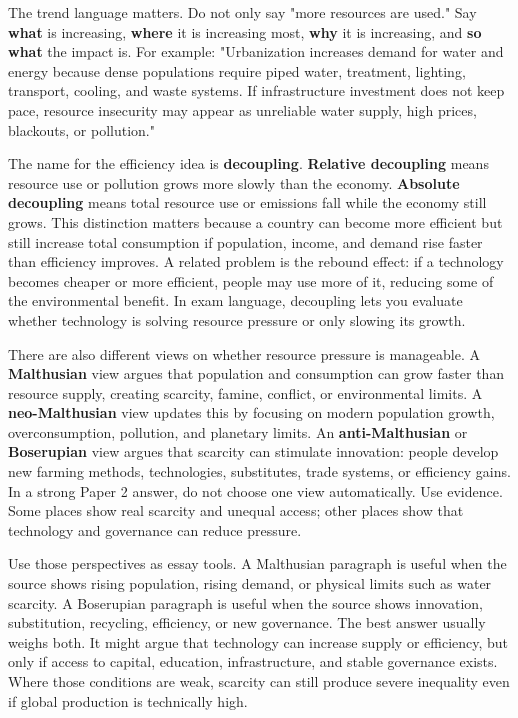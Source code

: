 \documentclass[11pt,a4paper]{article}
\newcommand{\term}[1]{\textcolor{HeadingBlue}{\textbf{#1}}}
\begin{document}
The trend language matters. Do not only say "more resources are used." Say
\term{what} is increasing, \term{where} it is increasing most, \term{why} it is
increasing, and \term{so what} the impact is. For example: "Urbanization
increases demand for water and energy because dense populations require piped
water, treatment, lighting, transport, cooling, and waste systems. If
infrastructure investment does not keep pace, resource insecurity may appear as
unreliable water supply, high prices, blackouts, or pollution."

The name for the efficiency idea is \term{decoupling}. \term{Relative
decoupling} means resource use or pollution grows more slowly than the economy.
\term{Absolute decoupling} means total resource use or emissions fall while the
economy still grows. This distinction matters because a country can become more
efficient but still increase total consumption if population, income, and demand
rise faster than efficiency improves. A related problem is the rebound effect:
if a technology becomes cheaper or more efficient, people may use more of it,
reducing some of the environmental benefit. In exam language, decoupling lets
you evaluate whether technology is solving resource pressure or only slowing its
growth.

There are also different views on whether resource pressure is manageable. A
\term{Malthusian} view argues that population and consumption can grow faster
than resource supply, creating scarcity, famine, conflict, or environmental
limits. A \term{neo-Malthusian} view updates this by focusing on modern
population growth, overconsumption, pollution, and planetary limits. An
\term{anti-Malthusian} or \term{Boserupian} view argues that scarcity can
stimulate innovation: people develop new farming methods, technologies,
substitutes, trade systems, or efficiency gains. In a strong Paper 2 answer, do
not choose one view automatically. Use evidence. Some places show real scarcity
and unequal access; other places show that technology and governance can reduce
pressure.

Use those perspectives as essay tools. A Malthusian paragraph is useful when
the source shows rising population, rising demand, or physical limits such as
water scarcity. A Boserupian paragraph is useful when the source shows
innovation, substitution, recycling, efficiency, or new governance. The best
answer usually weighs both. It might argue that technology can increase supply
or efficiency, but only if access to capital, education, infrastructure, and
stable governance exists. Where those conditions are weak, scarcity can still
produce severe inequality even if global production is technically high.
\end{document}
